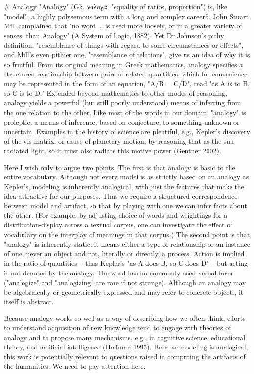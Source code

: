 # Analogy
"Analogy" (Gk. ναλoγα, "equality of ratios, proportion") is, like "model", a highly polysemous term with a long and complex career5. John Stuart Mill complained that "no word … is used more loosely, or in a greater variety of senses, than Analogy" (A System of Logic, 1882). Yet Dr Johnson's pithy definition, "resemblance of things with regard to some circumstances or effects", and Mill's even pithier one, "resemblance of relations", give us an idea of why it is so fruitful. From its original meaning in Greek mathematics, analogy specifies a structured relationship between pairs of related quantities, which for convenience may be represented in the form of an equation, "A/B = C/D", read "as A is to B, so C is to D." Extended beyond mathematics to other modes of reasoning, analogy yields a powerful (but still poorly understood) means of inferring from the one relation to the other. Like most of the words in our domain, "analogy" is proleptic, a means of inference, based on conjecture, to something unknown or uncertain. Examples in the history of science are plentiful, e.g., Kepler's discovery of the vis matrix, or cause of planetary motion, by reasoning that as the sun radiated light, so it must also radiate this motive power (Gentner 2002).

Here I wish only to argue two points. The first is that analogy is basic to the entire vocabulary. Although not every model is as strictly based on an analogy as Kepler's, modeling is inherently analogical, with just the features that make the idea attractive for our purposes. Thus we require a structured correspondence between model and artifact, so that by playing with one we can infer facts about the other. (For example, by adjusting choice of words and weightings for a distribution-display across a textual corpus, one can investigate the effect of vocabulary on the interplay of meanings in that corpus.) The second point is that "analogy" is inherently static: it means either a type of relationship or an instance of one, never an object and not, literally or directly, a process. Action is implied in the ratio of quantities – thus Kepler's "as A does B, so C does D" – but acting is not denoted by the analogy. The word has no commonly used verbal form ("analogize" and "analogizing" are rare if not strange). Although an analogy may be algebraically or geometrically expressed and may refer to concrete objects, it itself is abstract.

Because analogy works so well as a way of describing how we often think, efforts to understand acquisition of new knowledge tend to engage with theories of analogy and to propose many mechanisms, e.g., in cognitive science, educational theory, and artificial intelligence (Hoffman 1995). Because modeling is analogical, this work is potentially relevant to questions raised in computing the artifacts of the humanities. We need to pay attention here.

